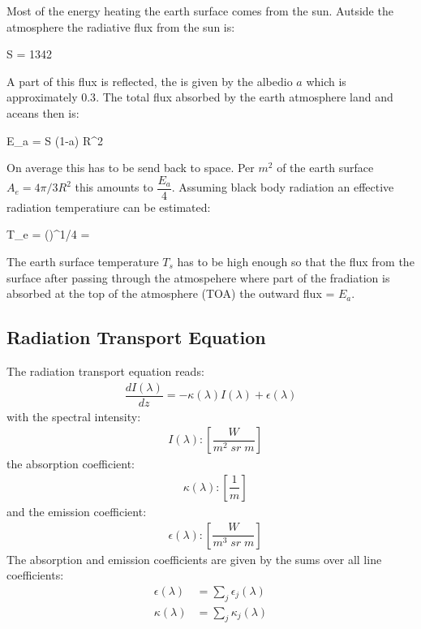 Most of the energy heating the earth surface comes from the sun. Autside the atmosphere the radiative flux from the sun is:
\begin{itemize}
	S = 1342 \; 
\end{itemize}
A part of this flux is reflected, the is given by the albedio $a$
which is approximately $0.3$.
The total flux absorbed by the earth atmosphere land and aceans then is:
\begin{itemize}
	E_a = S (1-a) \pi R^2
\begin{itemize}
On average this has to be send back to space. Per $m^2$ of the earth surface $A_e = 4 \pi/3 R^2$ this amounts to $\dfrac{E_a}{4}$. 
Assuming black body radiation an effective radiation temperatiure can be estimated:
\begin{itemize}
	T_e = \left(\right)^{1/4} \approx = 
\end{itemize}
The earth surface temperature $T_s$ has to be high enough so that the flux from the surface after passing through the atmospehere where part of the fradiation is absorbed
at the top of the atmosphere (TOA) the outward flux = $E_a$.

\subsection{Radiation Transport Equation}

The radiation transport equation reads:
\begin{align}
	\label{eqn1}
	\dfrac{d I(\lambda)}{dz} = - \kappa(\lambda) I(\lambda) + \epsilon(\lambda)
\end{align}
with the spectral intensity:
\begin{align*}
	&I(\lambda)    : \left[\dfrac{W}{m^2 \; sr \; m}\right]
\end{align*}
the absorption coefficient:
\begin{align*}
	&\kappa(\lambda)   : \left[\dfrac{1}{m}\right]
\end{align*}
and the emission coefficient:
\begin{align*}
	&\epsilon(\lambda) : \left[\dfrac{W}{m^3 \; sr \; m}\right]
\end{align*}
The absorption and emission coefficients are given by the sums over all 
line coefficients:
\begin{align*}
	\epsilon(\lambda) &= \sum_j \epsilon_j(\lambda) \\
	\kappa(\lambda) &= \sum_j \kappa_j(\lambda)
\end{align*}


\end{itemize}
\end{itemize}
